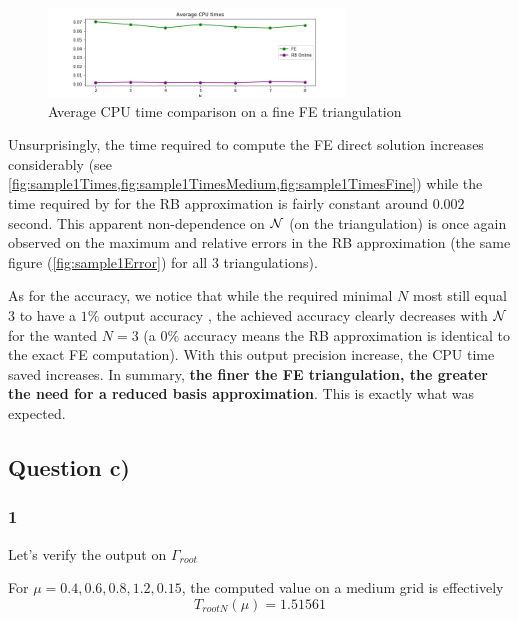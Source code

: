 \documentclass[
	english,
	11pt, %
]{fphw}
\begin{document}
\begin{figure}[H]
	\centering
	\includegraphics[width=0.7\textwidth]{sample1TimeFine.png}
	\caption{Average CPU time comparison on a fine FE triangulation}
	\label{fig:sample1TimesFine}
\end{figure}

Unsurprisingly, the time required to compute the FE direct solution increases considerably (see \cref{fig:sample1Times,fig:sample1TimesMedium,fig:sample1TimesFine}) while the time required by for the RB approximation is fairly constant around $0.002$ second. This apparent non-dependence on $\cal{N}$ (on the triangulation) is once again observed on the maximum and relative errors in the RB approximation (the same figure (\cref{fig:sample1Error}) for all 3 triangulations).

As for the accuracy, we notice that while the required minimal $N$ most still equal $3$ to have a $1 \%$ output accuracy , the achieved accuracy clearly decreases with $\cal{N}$ for the wanted $N=3$ (a $0 \%$ accuracy means the RB approximation is identical to the exact FE computation). With this output precision increase, the CPU time saved increases. In summary, \textbf{the finer the FE triangulation, the greater the need for a reduced basis approximation}. This is exactly what was expected.  



\subsection*{Question c)}
\subsubsection*{1}

\begin{problem}
	Let's verify the output on $\Gamma_{root}$
\end{problem}

For $\mu = 0.4, 0.6, 0.8, 1.2, 0.15$, the computed value on a medium grid is effectively $$T_{rootN}(\mu)=1.51561$$
\end{document}

